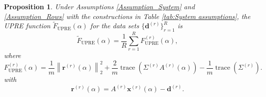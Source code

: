 \documentclass[12pt]{article}
\newcommand{\mA}{m}	%
\newcommand{\dVec}{\mathbf{d}}	%
\newcommand{\rVec}{\mathbf{r}}	%
\newcommand{\xVec}{\mathbf{x}}	%
\DeclareMathOperator{\trace}{trace}		%
\newcommand{\regparam}{\alpha}  %
\newcommand{\U}{F_{\text{UPRE}}}	%
\newcommand{\UBig}{\widetilde{F}_{\text{UPRE}}}	%
\newtheorem{proposition}{Proposition}[section]
\begin{document}
\begin{proposition}
Under Assumptions \ref{Assumption_System} and \ref{Assumption_Rows} with the constructions in Table \ref{tab:System assumptions}, the UPRE function $\UBig(\regparam)$ for the data sets $\{\dVec^{(r)}\}_{r=1}^R$ is
\begin{equation}
\label{eq:Averaged UPRE}
\UBig(\regparam) = \frac{1}{R} \sum_{r=1}^R \U^{(r)}(\regparam),
\end{equation}
where
\begin{equation}
\label{eq:Individual UPRE}
\U^{(r)}(\regparam) = \frac{1}{\mA}\left\|\rVec^{(r)}(\regparam)\right\|_2^2 + \frac{2}{\mA} \trace\left(\Sigma^{(r)} A^{(r)}(\regparam)\right) - \frac{1}{\mA} \trace\left(\Sigma^{(r)}\right).
\end{equation}
with
\begin{equation}
\label{eq:Single Regularized Residual}
    \rVec^{(r)}(\regparam) = A^{(r)}\xVec^{(r)}(\regparam) - \dVec^{(r)}.
\end{equation}
\end{proposition}
\end{document}
